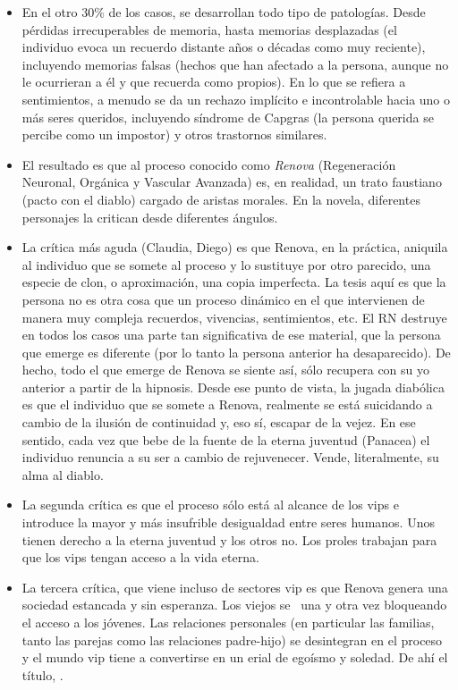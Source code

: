\begin{itemize}
\item En el otro 30\% de los casos, se desarrollan todo tipo de patologías. Desde pérdidas irrecuperables de memoria, hasta memorias desplazadas (el individuo evoca un recuerdo distante años o décadas como muy reciente), incluyendo memorias falsas (hechos que han afectado a la persona, aunque no le ocurrieran a él y que recuerda como propios). En lo que se refiera a sentimientos, a menudo se da un rechazo implícito e incontrolable hacia uno o más seres queridos, incluyendo síndrome de Capgras (la persona querida se percibe como un impostor) y otros trastornos similares. 
\item El resultado es que al proceso conocido como {\em Renova} (Regeneración Neuronal, Orgánica y Vascular Avanzada) es, en realidad, un trato faustiano (pacto con el diablo) cargado de aristas morales. En la novela, diferentes personajes la critican desde diferentes ángulos.
\item La crítica más aguda (Claudia, Diego) es que Renova, en la práctica, aniquila al individuo que se somete al proceso y lo sustituye por otro parecido, una especie de clon, o aproximación, una copia imperfecta. La tesis aquí es que la persona no es otra cosa que un proceso dinámico en el que intervienen de manera muy compleja recuerdos, vivencias, sentimientos, etc. El RN destruye en todos los casos una parte tan significativa de ese material, que la persona que emerge es diferente (por lo tanto la persona anterior ha desaparecido). De hecho, todo el que emerge de Renova se siente así, sólo recupera  con su yo anterior a partir de la hipnosis. Desde ese punto de vista, la jugada diabólica es que el individuo que se somete a Renova, realmente se está suicidando a cambio de la ilusión de continuidad y, eso sí, escapar de la vejez. En ese sentido, cada vez que bebe de la fuente de la eterna juventud (Panacea) el individuo renuncia a su ser a cambio de rejuvenecer. Vende, literalmente, su alma al diablo. 
\item La segunda crítica es que el proceso sólo está al alcance de los vips e introduce la mayor y más insufrible desigualdad entre seres humanos. Unos tienen derecho a la eterna juventud y los otros no. Los proles trabajan para que los vips tengan acceso a la vida eterna. 
\item La tercera crítica, que viene incluso de sectores vip es que Renova genera una sociedad estancada y sin esperanza. Los viejos se ~una y otra vez bloqueando el acceso a los jóvenes. Las relaciones personales (en particular las familias, tanto las parejas como las relaciones padre-hijo) se desintegran en el proceso y el mundo vip tiene a convertirse en un erial de egoísmo y soledad. De ahí el título, .  
\end{itemize}

